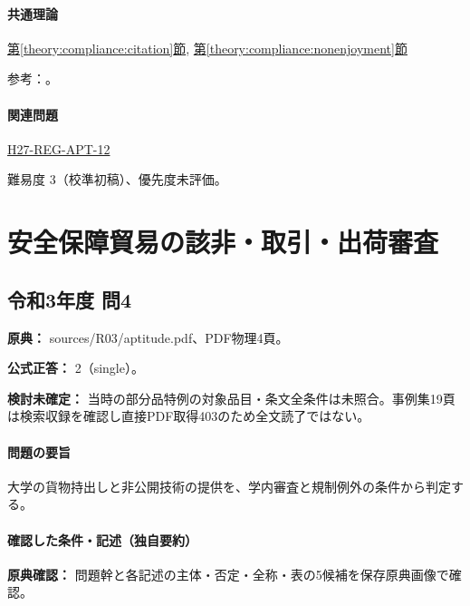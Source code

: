 \paragraph{共通理論} \hyperref[theory:compliance:citation]{第\ref*{theory:compliance:citation}節}, \hyperref[theory:compliance:nonenjoyment]{第\ref*{theory:compliance:nonenjoyment}節}

\par 参考：\cite{bunka_citation_faq,bunka_amend2018,bunka_ai2024,bunka_text2026}。

\paragraph{関連問題} \hyperref[q:h27-reg-apt-12]{H27-REG-APT-12}

\par 難易度 3（校準初稿）、優先度未評価。

\section{安全保障貿易の該非・取引・出荷審査}

\subsection{令和3年度 問4}
\label{q:r03-reg-apt-04}

\noindent\textbf{原典：} sources/R03/aptitude.pdf、PDF物理4頁。

\textbf{公式正答：} 2（single）。

\par\textbf{検討未確定：} 当時の部分品特例の対象品目・条文全条件は未照合。事例集19頁は検索収録を確認し直接PDF取得403のため全文読了ではない。

\paragraph{問題の要旨} 大学の貨物持出しと非公開技術の提供を、学内審査と規制例外の条件から判定する。

\paragraph{確認した条件・記述（独自要約）}\mbox{}\par

\noindent\textbf{原典確認：} 問題幹と各記述の主体・否定・全称・表の5候補を保存原典画像で確認。\par

